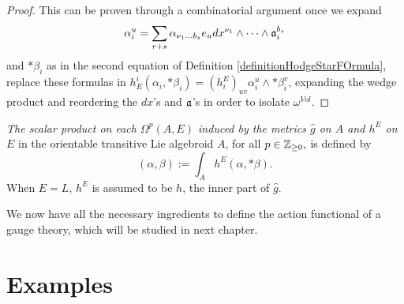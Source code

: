 \begin{proof}
This can be proven through a combinatorial argument once we expand $$\alpha_i^u = \sum_{r+s} \alpha_{\nu_1 \dots b_s} e_u dx^{\nu_1} \wedge \cdots \wedge \mathfrak{a}_i^{b_s}$$ and $*\beta_i$ as in the second equation of Definition \ref{definitionHodgeStarFOrmula}, replace these formulas in $h^i_E(\alpha_i, *\beta_i) = (h^E_i)_{uv} \alpha_i^u \wedge * \beta_i^v$, expanding the wedge product and reordering the $dx$'s and $\mathfrak{a}$'s in order to isolate $\omega^{Vol}$.
\end{proof}

\begin{definition}
\emph{The scalar product on each $\Omega^p(A, E)$ induced by the metrics $\hat g$ on $A$ and $h^E$ on $E$} 
in the orientable transitive Lie algebroid $A$, for all $p \in \mathbb{Z}_{\geq 0},$ is defined by
\begin{equation*}
    (\alpha, \beta) := \int_A h^E(\alpha, *\beta).
\end{equation*}
When $E = L$, $h^E$ is assumed to be $h$, the inner part of $\hat g$.
\end{definition}


We now have all the necessary ingredients to define the action functional of a gauge theory, which will be studied in next chapter.

\section{Examples}
\label{chIntegrationSectionExamples}


